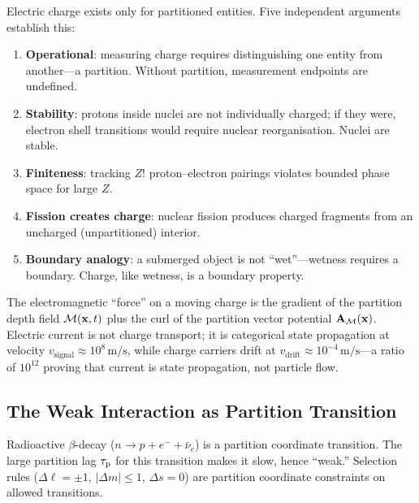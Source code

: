\begin{theorem}
\label{thm:ch21-charge-em}
  Electric charge exists only for partitioned entities.  Five independent
  arguments establish this:
  \begin{enumerate}
    \item \textbf{Operational}: measuring charge requires distinguishing one
      entity from another---a partition.  Without partition, measurement
      endpoints are undefined.
    \item \textbf{Stability}: protons inside nuclei are not individually
      charged; if they were, electron shell transitions would require nuclear
      reorganisation.  Nuclei are stable.
    \item \textbf{Finiteness}: tracking $Z!$ proton--electron pairings violates
      bounded phase space for large $Z$.
    \item \textbf{Fission creates charge}: nuclear fission produces charged
      fragments from an uncharged (unpartitioned) interior.
    \item \textbf{Boundary analogy}: a submerged object is not ``wet''---wetness
      requires a boundary.  Charge, like wetness, is a boundary property.
  \end{enumerate}
\end{theorem}

The electromagnetic ``force'' on a moving charge is the gradient of the
partition depth field $\mathcal{M}(\mathbf{x},t)$ plus the curl of the partition
vector potential $\mathbf{A}_{\mathcal{M}}(\mathbf{x})$.  Electric current is not charge
transport; it is categorical state propagation at velocity $v_{\mathrm{signal}}
\approx 10^8\,\mathrm{m/s}$, while charge carriers drift at
$v_{\mathrm{drift}} \approx 10^{-4}\,\mathrm{m/s}$---a ratio of $10^{12}$
proving that current is state propagation, not particle flow.

\subsection{The Weak Interaction as Partition Transition}

\begin{theorem}
  Radioactive $\beta$-decay ($n \to p + e^- + \bar\nu_e$) is a partition
  coordinate transition.  The large partition lag $\tau_{\mathrm{p}}$ for this transition
  makes it slow, hence ``weak.''  Selection rules ($\Delta\ell = \pm 1$,
  $|\Delta m|\leq 1$, $\Delta s = 0$) are partition coordinate constraints on
  allowed transitions.
\end{theorem}

